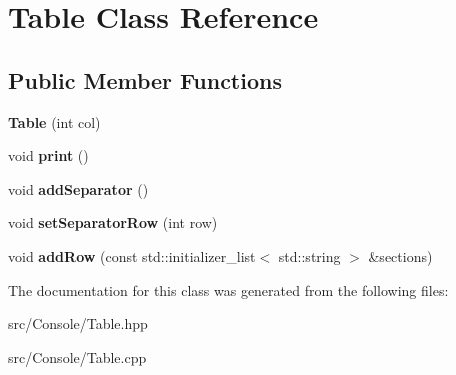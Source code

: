 \hypertarget{class_table}{}\section{Table Class Reference}
\label{class_table}
\subsection*{Public Member Functions}
\begin{DoxyCompactItemize}
\item 
\mbox{\label{class_table_a70bdd83ee8bd2f7579137227554827a0}} 
{\bfseries Table} (int col)
\item 
\mbox{\label{class_table_a0de5a9ca880b662ec7d608de686e309a}} 
void {\bfseries print} ()
\item 
\mbox{\label{class_table_a873ab12c54c5bdd98343a8a134c4ab01}} 
void {\bfseries add\+Separator} ()
\item 
\mbox{\label{class_table_a68c1f35216327e95b126e548e9bc5804}} 
void {\bfseries set\+Separator\+Row} (int row)
\item 
\mbox{\label{class_table_aedf028e43bb7c0cf188ee01627b24b00}} 
void {\bfseries add\+Row} (const std\+::initializer\+\_\+list$<$ std\+::string $>$ \&sections)
\end{DoxyCompactItemize}


The documentation for this class was generated from the following files\+:\begin{DoxyCompactItemize}
\item 
src/\+Console/Table.\+hpp\item 
src/\+Console/Table.\+cpp\end{DoxyCompactItemize}
